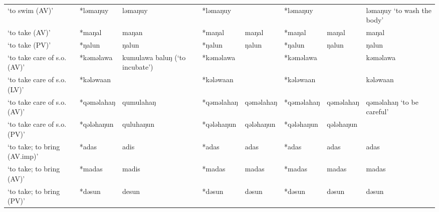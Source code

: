 \begin{landscape}
\begin{longtable}[c]{@{}p{3cm}<{\raggedright}p{2.75cm}<{\raggedright}p{2.75cm}<{\raggedright}p{2.75cm}<{\raggedright}p{2.75cm}<{\raggedright}p{2.75cm}<{\raggedright}p{2.75cm}<{\raggedright}p{2.75cm}<{\raggedright}@{}}
`to swim (AV)'                                       & *ləmaŋuy           & ləmaŋuy                        & *ləmaŋuy           &                            & *ləmaŋuy         &                          & ləmaŋuy `to wash the body'        \\
`to take (AV)'                                       & *maŋal             & maŋan                          & *maŋal             & maŋal                      & *maŋal           & maŋal                    & maŋal                             \\
`to take (PV)'                                       & *ŋalun             & ŋalun                          & *ŋalun             & ŋalun                      & *ŋalun           & ŋalun                    & ŋalun                             \\
`to take care of s.o. (AV)'                          & *kəməlawa          & kumulawa baluŋ (`to incubate') & *kəməlawa          &                            & *kəməlawa        &                          & kəməlawa                          \\
`to take care of s.o. (LV)'                          & *kələwaan          &                                & *kələwaan          &                            & *kələwaan        &                          & kələwaan                          \\
`to take care of s.o. (AV)'                          & *qəməlahaŋ         & qumulahaŋ                      & *qəməlahaŋ         & qəməlahaŋ                  & *qəməlahaŋ       & qəməlahaŋ                & qəməlahaŋ `to be careful'         \\
`to take care of s.o. (PV)'                          & *qələhaŋun         & quluhaŋun                      & *qələhaŋun         & qələhaŋun                  & *qələhaŋun       & qələhaŋun                &                                   \\
`to take; to bring (AV.imp)'                         & *adas              & adis                           & *adas              & adas                       & *adas            & adas                     & adas                              \\
`to take; to bring (AV)'                             & *madas             & madis                          & *madas             & madas                      & *madas           & madas                    & madas                             \\
`to take; to bring (PV)'                             & *dəsun             & desun                          & *dəsun             & dəsun                      & *dəsun           & dəsun                    & dəsun                             \\

\end{longtable}
\end{landscape}
